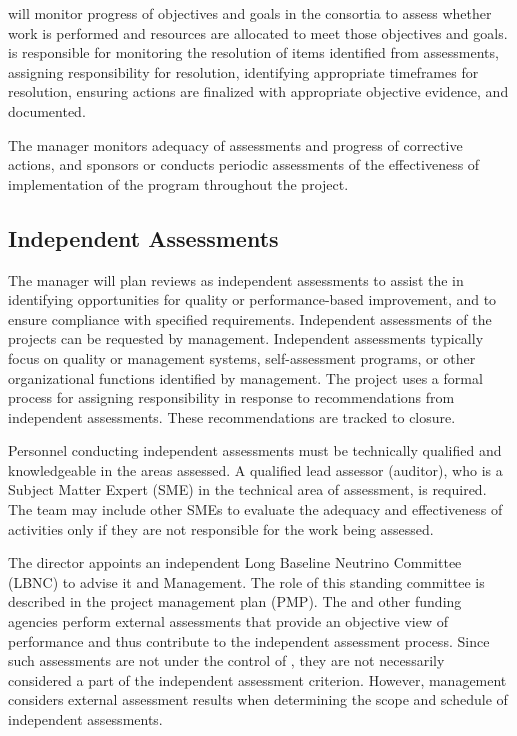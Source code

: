   will monitor progress
of objectives and goals in the consortia to assess whether work is
performed and resources are allocated to meet those objectives and
goals.    is responsible for monitoring the
resolution of items identified from assessments, assigning
responsibility for resolution, identifying appropriate timeframes for
resolution, ensuring actions are finalized with appropriate objective
evidence, and documented.

The   manager monitors adequacy of
assessments and progress of corrective actions, and sponsors or conducts
periodic assessments of the effectiveness of implementation of the 
program throughout the  project.




\subsection{Independent Assessments}

The   manager will plan reviews as
independent assessments to assist the   in
identifying opportunities for quality or performance-based improvement,
and to ensure compliance with specified requirements. Independent
assessments of the  projects can be requested by
 management. Independent assessments typically focus on
quality or  management systems, self-assessment programs, or
other organizational functions identified by management. The
 project uses a formal process for assigning
responsibility in response to recommendations from independent
assessments. These recommendations are tracked to closure.

Personnel conducting independent assessments must be technically
qualified and knowledgeable in the areas assessed. A qualified lead
assessor (auditor), who is a Subject Matter Expert (SME) in the
technical area of assessment, is required. The team may include other
SMEs to evaluate the adequacy and effectiveness of activities only if
they are not responsible for the work being assessed.

The \fnal director appoints an independent Long Baseline Neutrino
Committee (LBNC) to advise it and  Management. The role of
this standing committee is described in the 
project management plan (PMP). The  and other funding agencies perform external
assessments that provide an objective view of performance and thus
contribute to the independent assessment process. Since such
assessments are not under the control of , they are not
necessarily considered a part of the independent assessment
criterion. However,  management considers external
assessment results when determining the scope and schedule of
independent assessments.

